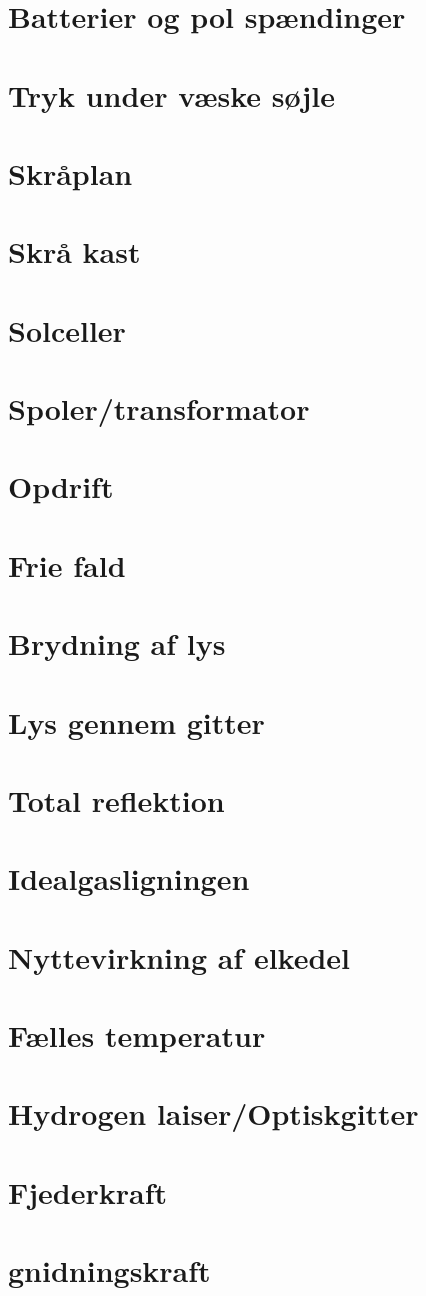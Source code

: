 \section{Batterier og pol spændinger}
\section{Tryk under væske søjle}
\section{Skråplan}
\section{Skrå kast}
\section{Solceller}
\section{Spoler/transformator}
\section{Opdrift}
\section{Frie fald}
\section{Brydning af lys}
\section{Lys gennem gitter}
\section{Total reflektion}
\section{Idealgasligningen}
\section{Nyttevirkning af elkedel}
\section{Fælles temperatur}
\section{Hydrogen laiser/Optiskgitter}
\section{Fjederkraft}
\section{gnidningskraft}
